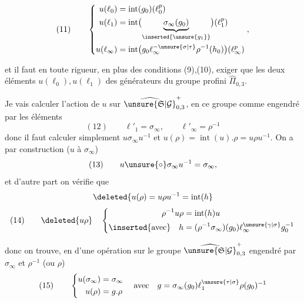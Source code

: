 
\[
(11)\qquad
\left\{
\begin{aligned}
u(\ell_0)&=\operatorname{int}(g_0)(\ell_0^p)\\
u(\ell_1)&=\operatorname{int}\bigl(\underbrace{\sigma_\infty(g_0)}_{\inserted{\unsure{g_1}}}\bigr)(\ell_1^p)\\
u(\ell_\infty)&=\operatorname{int}\bigl(g_0\ell_\infty^{-\unsure{\sigma|\tau}}\rho^{-1}(h_0)\bigr)(\ell_\infty^p)
\end{aligned}
\right.,
\]

et il faut en toute rigueur, en plus des conditions (9),(10), exiger que les deux éléments $u(\ell_0),u(\ell_1)$   des générateurs du groupe profini $\widehat{\Pi}_{0,3}$.

Je vais calculer l'action de $u$ sur $\widehat{\unsure{\mathfrak S|\mathcal G}}_{0,3}^{+}$, en  ce groupe comme engendré par les éléments
\[
(12)\qquad \ell'_1=\sigma_\infty,\qquad \ell'_\infty=\rho^{-1}
\]
donc il faut calculer simplement  $u\sigma_\infty u^{-1}$ et $u(\rho)=\operatorname{int}(u).\rho=u\rho u^{-1}$. On a par construction ($u$  à $\sigma_\infty$)
\[
(13)\qquad u\unsure{\circ}\sigma_\infty u^{-1}=\sigma_\infty,
\]
et d'autre part on vérifie que
\[
\deleted{u(\rho)=u\rho u^{-1}=\operatorname{int}(h}
\]
\[
(14)\qquad \deleted{u\rho}\quad
\left\{
\begin{aligned}
\rho^{-1}u\rho&=\operatorname{int}(h)u\\
\inserted{\text{avec}}\quad h&=(\rho^{-1}\sigma_\infty)(g_0)\ell_\infty^{\unsure{\gamma|\sigma}}g_0^{-1}
\end{aligned}
\right.
\]

donc on trouve, en  d'une opération sur le groupe $\widehat{\unsure{\mathfrak S|\mathcal G}}_{0,3}^{+}$ engendré par $\sigma_\infty$ et $\rho^{-1}$ (ou $\rho$)
\[
(15)\qquad
\left\{
\begin{aligned}
u(\sigma_\infty)&=\sigma_\infty\\
u(\rho)&=g.\rho
\end{aligned}
\right.
\quad\text{avec}\quad
 g=\sigma_\infty(g_0)\ell_1^{\unsure{\tau|\sigma}}\rho(g_0)^{-1}
\]

